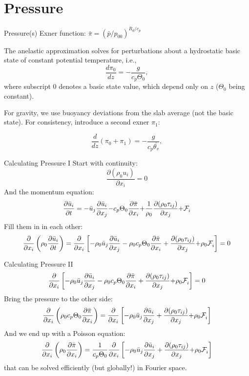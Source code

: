 \section[Pressure]{Pressure}
\begin{frame}[allowframebreaks]{Pressure(s)}
Exner function: $\bar{\pi}=(\bar{p}/p_{00})^{R_d/c_p}$ 

The anelastic approximation solves for perturbations about a
hydrostatic basic state of constant potential temperature, i.e.,
\begin{equation*}
\frac{d\pi_0}{dz} = -\frac{g}{c_p\Theta_0},
\end{equation*}
where subscript $0$ denotes a basic state value, which depend only on
$z$ ($\Theta_0$ being constant).  

For gravity, we use buoyancy deviations from the slab average (not the basic state).
For consistency, introduce a second exner $\pi_1$:

\begin{equation*}
\frac{d}{dz}(\pi_0 + \pi_1) = -\frac{g}{c_p\bar{\theta_v}},
\end{equation*}
\end{frame}
\begin{frame}{Calculating Pressure I}
Start with continuity:
\[
  \frac{\partial (\rho_0 u_i) }{\partial x_i} = 0 
\]
\pause
And the momentum equation:
\[
\frac{\partial \bar{u}_i}{\partial t}  = 
{- \bar{u}_j \frac{\partial \bar{u}_i}{\partial x_j} }
{- c_p \Theta_0 \frac{\partial\bar{\pi}}{\partial x_i}}
{+ \frac{1}{\rho_0} \frac{\partial (\rho_0 \tau_{ij})} {\partial x_j}}
{ + \mathcal{F}_{i}^{\mathrm{}} } 
\]
\pause
Fill them in in each other:
\[
\frac{\partial }{\partial x_i}\left(\rho_0\frac{\partial \bar{u}_i}{\partial t}\right)   =\frac{\partial }{\partial x_i}\left[
- \rho_0\bar{u}_j \frac{\partial \bar{u}_i}{\partial x_j} 
- \rho_0 c_p \Theta_0 \frac{\partial\bar{\pi}}{\partial x_i}
+ \frac{\partial (\rho_0 \tau_{ij})} {\partial x_j}
{ + \rho_0\mathcal{F}_{i}^{\mathrm{}} }\right] = 0
\]
\end{frame}
\begin{frame}{Calculating Pressure II}
\[
\frac{\partial }{\partial x_i}\left[
- \rho_0\bar{u}_j \frac{\partial \bar{u}_i}{\partial x_j} 
- \rho_0 c_p \Theta_0 \frac{\partial\bar{\pi}}{\partial x_i}
+ \frac{\partial (\rho_0 \tau_{ij})} {\partial x_j}
{ + \rho_0\mathcal{F}_{i}^{\mathrm{}} }\right] = 0
\]
Bring the pressure to the other side:
\[
\frac{\partial }{\partial x_i}\left(\rho_0{ c_p \Theta_0 \frac{\partial\bar{\pi}}{\partial x_i}}\right)   = \frac{\partial }{\partial x_i}\left[
- \rho_0\bar{u}_j \frac{\partial \bar{u}_i}{\partial x_j} 
+ \frac{\partial (\rho_0 \tau_{ij})} {\partial x_j}
{ + \rho_0\mathcal{F}_{i}^{\mathrm{}} }\right] 
\]
\pause
And we end up with a Poisson equation:
\[
\frac{\partial }{\partial x_i}\left(\rho_0{\frac{\partial\bar{\pi}}{\partial x_i}}\right)   = \frac{1}{ c_p \Theta_0 }\frac{\partial }{\partial x_i}\left[
- \rho_0\bar{u}_j \frac{\partial \bar{u}_i}{\partial x_j} 
+ \frac{\partial (\rho_0 \tau_{ij})} {\partial x_j}
{ + \rho_0\mathcal{F}_{i}^{\mathrm{}} }\right] 
\]
that can be solved efficiently (but globally!) in Fourier space.
\end{frame}
